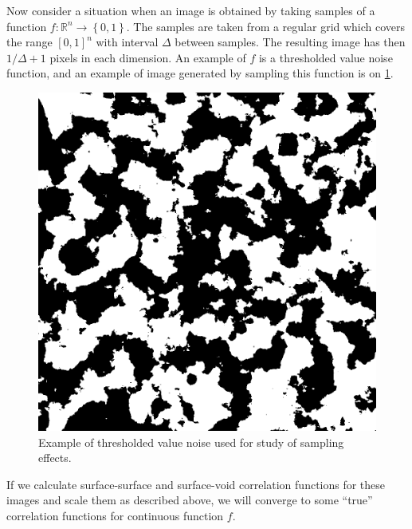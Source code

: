 \documentclass[reprint,amsmath,amssymb,aps,pre]{revtex4-1}
\begin{document}
Now consider a situation when an image is obtained by taking samples of a function
$f: \mathbb{R}^n \rightarrow \left\{0, 1\right\}$. The samples are taken from a
regular grid which covers the range $[0, 1]^n$  with interval $\Delta$ between
samples. The resulting image has then $1/\Delta + 1$ pixels in each
dimension. An example of $f$ is a thresholded value noise function, and an
example of image generated by sampling this function is on \cref{fig:noise}.

\begin{figure}[ht]
  \centering
  \includegraphics[width=0.9\linewidth]{images/noise.png}
  \caption[]{Example of thresholded value noise used for study of sampling
    effects.}
  \label{fig:noise}
\end{figure}

If we calculate surface-surface and surface-void correlation functions for these
images and scale them as described above, we will converge to some ``true''
correlation functions for continuous function $f$.
\end{document}
